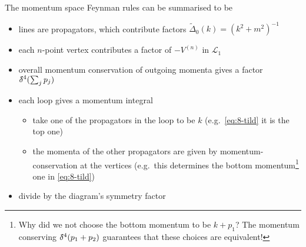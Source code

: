 The momentum space Feynman rules can be summarised to be
\begin{itemize}
  \item lines are propagators, which contribute factors $\widetilde{\Delta}_0(k) = (k^2 + m^2)^{-1}$
  \item each $n$-point vertex contributes a factor of $-V^{(n)}$ in $\mathscr{L}_1$
  \item overall momentum conservation of outgoing momenta gives a factor $\delta\hspace*{-0.2em}\bar{}\hspace*{0.2em}^4(\sum_j p_j)$ 
  \item each loop gives a momentum integral
    \begin{itemize}
      \item take one of the propagators in the loop to be $k$ (e.g.~\eqref{eq:8-tild} it is the top one)
      \item the momenta of the other propagators are given by momentum-conservation at the vertices (e.g.~this determines the bottom momentum\footnote{Why did we not choose the bottom momentum to be $k + p_1$? The momentum conserving $\delta\hspace*{-0.2em}\bar{}\hspace*{0.2em}^4(p_1 + p_2)$ guarantees that these choices are equivalent!} one in \eqref{eq:8-tild})
    \end{itemize}
  \item divide by the diagram's symmetry factor
\end{itemize}
